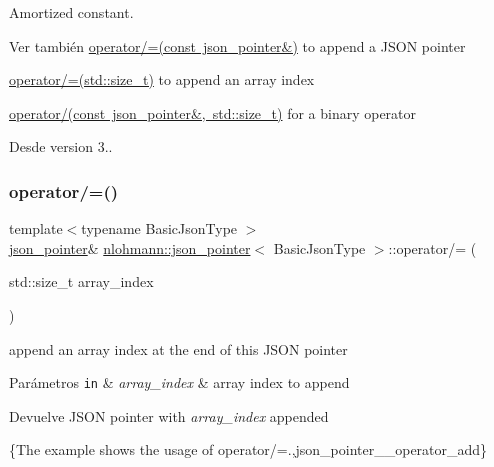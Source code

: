 Amortized constant.

\begin{DoxySeeAlso}{Ver también}
\mbox{\hyperlink{classnlohmann_1_1json__pointer_a7395bd0af29ac23fd3f21543c935cdfa}{operator/=(const json\+\_\+pointer\&)}} to append a J\+S\+ON pointer 

\mbox{\hyperlink{classnlohmann_1_1json__pointer_a64c8401529131bad1e486d91d703795f}{operator/=(std\+::size\+\_\+t)}} to append an array index 

\mbox{\hyperlink{classnlohmann_1_1json__pointer_a9f6bc6f4d4668b4e9a19d8b8ac29da4f}{operator/(const json\+\_\+pointer\&, std\+::size\+\_\+t)}} for a binary operator
\end{DoxySeeAlso}
\begin{DoxySince}{Desde}
version 3.. 
\end{DoxySince}
\mbox{\label{classnlohmann_1_1json__pointer_a64c8401529131bad1e486d91d703795f}} 
\subsubsection{\texorpdfstring{operator/=()}{operator/=()}\hspace{0.1cm}{\footnotesize\ttfamily [3/3]}}
{\footnotesize\ttfamily template$<$typename Basic\+Json\+Type $>$ \\
\mbox{\hyperlink{classnlohmann_1_1json__pointer}{json\+\_\+pointer}}\& \mbox{\hyperlink{classnlohmann_1_1json__pointer}{nlohmann\+::json\+\_\+pointer}}$<$ Basic\+Json\+Type $>$\+::operator/= (\begin{DoxyParamCaption}\item[{std\+::size\+\_\+t}]{array\+\_\+index }\end{DoxyParamCaption})\hspace{0.3cm}{\ttfamily [inline]}}



append an array index at the end of this J\+S\+ON pointer 


\begin{DoxyParams}[1]{Parámetros}
\mbox{\tt in}  & {\em array\+\_\+index} & array index to append \\
\hline
\end{DoxyParams}
\begin{DoxyReturn}{Devuelve}
J\+S\+ON pointer with {\itshape array\+\_\+index} appended
\end{DoxyReturn}
\{The example shows the usage of {\ttfamily operator/=}.,json\+\_\+pointer\+\_\+\+\_\+operator\+\_\+add\}

